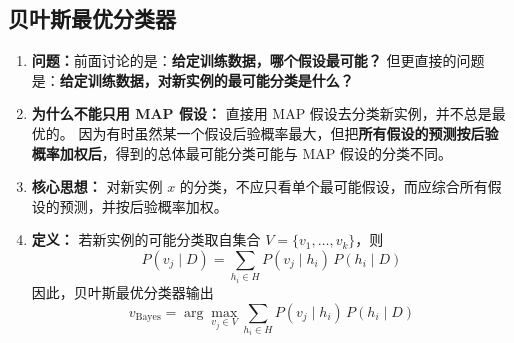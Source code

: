 \documentclass[../main.tex]{subfiles}
\begin{document}
\subsection{贝叶斯最优分类器}\label{sec:bayes-optimal-classifier}
\begin{enumerate}
    \item \textbf{问题：}前面讨论的是：\textbf{给定训练数据，哪个假设最可能？}  
    但更直接的问题是：\textbf{给定训练数据，对新实例的最可能分类是什么？}

    \item \textbf{为什么不能只用 MAP 假设：}
    直接用 MAP 假设去分类新实例，并不总是最优的。  
    因为有时虽然某一个假设后验概率最大，但把\textbf{所有假设的预测按后验概率加权后}，得到的总体最可能分类可能与 MAP 假设的分类不同。

    \item \textbf{核心思想：}
    对新实例 $x$ 的分类，不应只看单个最可能假设，而应综合所有假设的预测，并按后验概率加权。

    \item \textbf{定义：}
    若新实例的可能分类取自集合 $V=\{v_1,\ldots,v_k\}$，则
    \[
    P(v_j\mid D)=\sum_{h_i\in H}P(v_j\mid h_i)\,P(h_i\mid D)
    \]
    因此，贝叶斯最优分类器输出
    \[
    v_{\mathrm{Bayes}}
    =
    \arg\max_{v_j\in V}\sum_{h_i\in H}P(v_j\mid h_i)\,P(h_i\mid D)
    \]


\end{enumerate}
\end{document}
